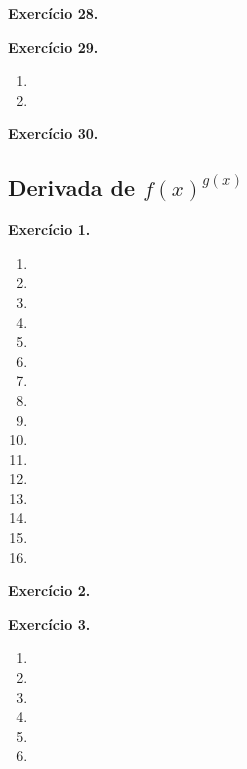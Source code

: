 \documentclass[12pt,a4paper]{article}
\begin{document}
\vspace{0.5cm}
\noindent\textbf{Exercício 28.}

\vspace{0.5cm}
\noindent\textbf{Exercício 29.}
\begin{enumerate}
    \renewcommand{\theenumi}{\alph{enumi}}
    \renewcommand{\labelenumi}{\theenumi)}
    \item 
    \item 
\end{enumerate}

\vspace{0.5cm}
\noindent\textbf{Exercício 30.}

\subsection{Derivada de $f(x)^{g(x)}$}

\vspace{0.5cm}
\noindent\textbf{Exercício 1.}
\begin{enumerate}
    \renewcommand{\theenumi}{\alph{enumi}}
    \renewcommand{\labelenumi}{\theenumi)}
    \item 
    \item 
    \item 
    \item 
    \item 
    \item 
    \item 
    \item 
    \item 
    \item 
    \item 
    \item 
    \item 
    \item 
    \item 
    \item 
\end{enumerate}

\vspace{0.5cm}
\noindent\textbf{Exercício 2.}

\vspace{0.5cm}
\noindent\textbf{Exercício 3.}
\begin{enumerate}
    \renewcommand{\theenumi}{\alph{enumi}}
    \renewcommand{\labelenumi}{\theenumi)}
    \item 
    \item 
    \item 
    \item 
    \item 
    \item 
\end{enumerate}
\end{document}
